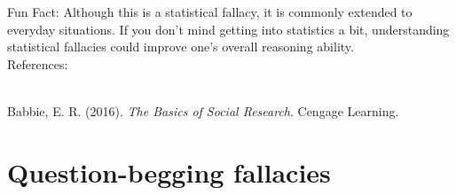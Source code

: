 \documentclass[a4paper,12pt,single,pdftex]{scrartcl}
\begin{document}
    
      Fun Fact: Although this is a statistical fallacy, it is commonly extended to everyday situations. If you don't mind getting into statistics a bit, understanding statistical fallacies could improve one's overall reasoning ability.
    \\

    References:

    
      
        
      \\

      
        
          Babbie, E. R. (2016). {\it The Basics of Social Research}. Cengage Learning.
        
      
    
  \section{Question-begging fallacies}
\end{document}
